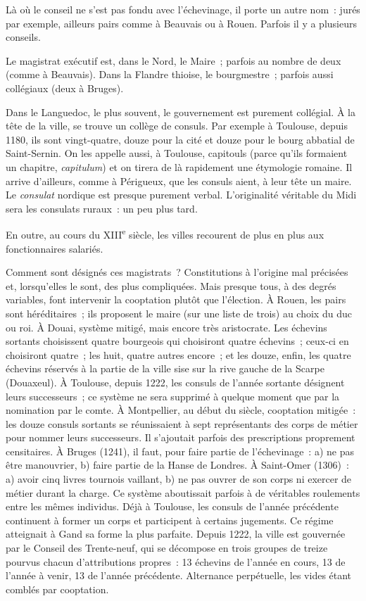 \documentclass[french,twoside]{book} %
\begin{document}
\noindent Là où le conseil ne s’est pas fondu avec l’échevinage, il porte un autre nom : jurés par exemple, ailleurs pairs comme à Beauvais ou à Rouen. Parfois il y a plusieurs conseils.\par
Le magistrat exécutif est, dans le Nord, le Maire ; parfois au nombre de deux (comme à Beauvais). Dans la Flandre thioise, le bourgmestre ; parfois aussi collégiaux (deux à Bruges).\par
Dans le Languedoc, le plus souvent, le gouvernement est purement collégial. À la tête de la ville, se trouve un collège de consuls. Par exemple à Toulouse, depuis 1180, ils sont vingt-quatre, douze pour la cité et douze pour le bourg abbatial de Saint-Sernin. On les appelle aussi, à Toulouse, capitouls (parce qu’ils formaient un chapitre, {\itshape capitulum}) et on tirera de là rapidement une étymologie romaine. Il arrive d’ailleurs, comme à Périgueux, que les  
\label{p76} consuls aient, à leur tête un maire. Le \emph{consulat} nordique est presque purement verbal. L’originalité véritable du Midi sera les consulats ruraux : un peu plus tard.\par
En outre, au cours du XIII\textsuperscript{e} siècle, les villes recourent de plus en plus aux fonctionnaires salariés.\par
Comment sont désignés ces magistrats ? Constitutions à l’origine mal précisées et, lorsqu’elles le sont, des plus compliquées. Mais presque tous, à des degrés variables, font intervenir la cooptation plutôt que l’élection. À Rouen, les pairs sont héréditaires ; ils proposent le maire (sur une liste de trois) au choix du duc ou roi. À Douai, système mitigé, mais encore très aristocrate. Les échevins sortants choisissent quatre bourgeois qui choisiront quatre échevins ; ceux-ci en choisiront quatre ; les huit, quatre autres encore ; et les douze, enfin, les quatre échevins réservés à la partie de la ville sise sur la rive gauche de la Scarpe (Douaxeul). À Toulouse, depuis 1222, les consuls de l’année sortante désignent leurs successeurs ; ce système ne sera supprimé à quelque moment que par la nomination par le comte. À Montpellier, au début du siècle, cooptation mitigée : les douze consuls sortants se réunissaient à sept représentants des corps de métier pour nommer leurs successeurs. Il s’ajoutait parfois des prescriptions proprement censitaires. À Bruges (1241), il faut, pour faire partie de l’échevinage : a) ne pas être manouvrier, b) faire partie de la Hanse de Londres. À Saint-Omer (1306) : a) avoir cinq livres tournois vaillant, b) ne pas ouvrer de son corps ni exercer de métier durant la charge. Ce système aboutissait parfois à de véritables roulements entre les mêmes individus. Déjà à Toulouse, les consuls de l’année précédente continuent à former un corps et participent à certains jugements. Ce régime atteignait à Gand sa forme la plus parfaite. Depuis 1222, la ville est gouvernée par le Conseil des Trente-neuf, qui se décompose en trois groupes de treize pourvus chacun d’attributions propres : 13 échevins de l’année en cours, 13 de l’année à venir, 13 de l’année précédente. Alternance perpétuelle, les vides étant comblés par cooptation.\par
\end{document}
